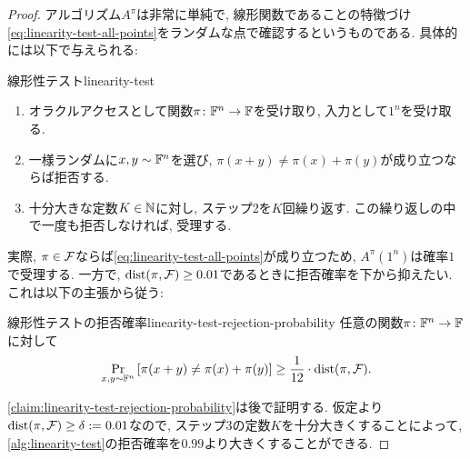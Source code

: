 \begin{proof}
  アルゴリズム$A^\pi$は非常に単純で, 線形関数であることの特徴づけ\cref{eq:linearity-test-all-points}をランダムな点で確認するというものである.
  具体的には以下で与えられる:
  \begin{algorithm}{線形性テスト}{linearity-test}
    \begin{enumerate}
      \item オラクルアクセスとして関数$\pi\colon \mathbb{F}^n\to\mathbb{F}$を受け取り, 入力として$1^n$を受け取る.
      \item 一様ランダムに$x,y\sim\mathbb{F}^n$を選び, $\pi(x+y)\ne \pi(x)+\pi(y)$が成り立つならば拒否する.
      \item 十分大きな定数$K\in\mathbb{N}$に対し, ステップ2を$K$回繰り返す. この繰り返しの中で一度も拒否しなければ, 受理する.
    \end{enumerate}
  \end{algorithm}

  実際, $\pi\in\mathcal{F}$ならば\cref{eq:linearity-test-all-points}が成り立つため, $A^\pi(1^n)$は確率$1$で受理する.
  一方で, $\mathrm{dist}(\pi,\mathcal{F})\ge 0.01$であるときに拒否確率を下から抑えたい.
  これは以下の主張から従う:

  \begin{claim}{線形性テストの拒否確率}{linearity-test-rejection-probability}
    任意の関数$\pi\colon \mathbb{F}^n\to\mathbb{F}$に対して
    \begin{align*}
      \Pr_{x,y\sim\mathbb{F}^n}\qty[ \pi(x+y) \ne \pi(x)+\pi(y) ] \ge \frac{1}{12}\cdot \mathrm{dist}(\pi,\mathcal{F}).
    \end{align*}  
  \end{claim}

  \cref{claim:linearity-test-rejection-probability}は後で証明する.
  仮定より$\mathrm{dist}(\pi,\mathcal{F})\ge \delta:=0.01$なので,
  ステップ3の定数$K$を十分大きくすることによって, \cref{alg:linearity-test}の拒否確率を$0.99$より大きくすることができる.
  \end{proof}

